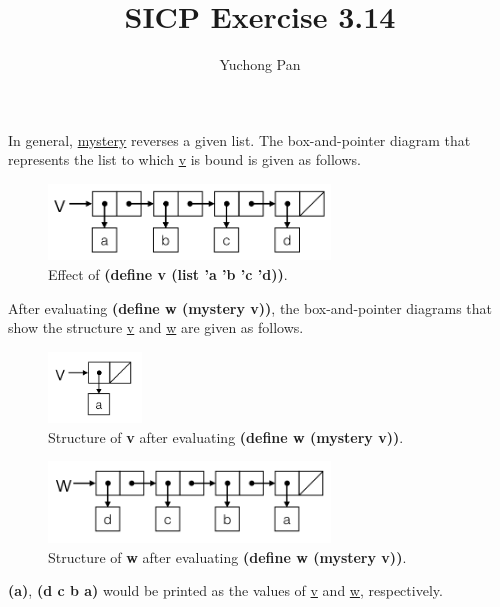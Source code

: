 \documentclass[11pt, oneside]{article}
\title{SICP Exercise 3.14}
\author{Yuchong Pan}
\begin{document}
\maketitle

In general, \url{mystery} reverses a given list. The box-and-pointer diagram that represents the list to which \url{v} is bound is given as follows.

\begin{figure}[h!]
    \centering\includegraphics[width=7.5cm]{ex-3.14-1.png}
    \caption{Effect of \textbf{(define v (list 'a 'b 'c 'd))}.}
\end{figure}

After evaluating \textbf{(define w (mystery v))}, the box-and-pointer diagrams that show the structure \url{v} and \url{w} are given as follows.

\begin{figure}[h!]
    \centering\includegraphics[width=2.5cm]{ex-3.14-2.png}
    \caption{Structure of \textbf{v} after evaluating \textbf{(define w (mystery v))}.}
\end{figure}

\begin{figure}[h!]
    \centering\includegraphics[width=7.5cm]{ex-3.14-3.png}
    \caption{Structure of \textbf{w} after evaluating \textbf{(define w (mystery v))}.}
\end{figure}

\textbf{(a)}, \textbf{(d c b a)} would be printed as the values of \url{v} and \url{w}, respectively.
\end{document}

